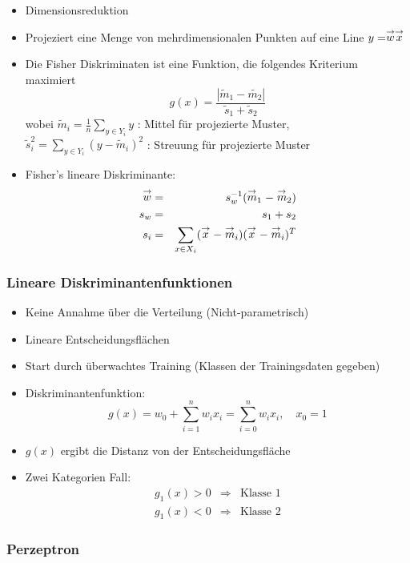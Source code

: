 \begin{itemize}
\item Dimensionsreduktion
\item Projeziert eine Menge von mehrdimensionalen Punkten auf eine Line $y = \stackrel{\to}{w} \stackrel{\to}{x}$
\item Die Fisher Diskriminaten ist eine Funktion, die folgendes Kriterium maximiert $$g(x) = \frac{| \tilde{m}_1 - \tilde{m_2}|}{\tilde{s}_1 + \tilde{s}_2}$$
wobei $\tilde{m}_i = \frac{1}{n} \sum\limits_{y \in Y_i} y$ : Mittel für projezierte Muster, $\tilde{s}_i^2 = \sum\limits_{y \in Y_i} (y - \tilde{m}_i)^2$ : Streuung für projezierte Muster
\item Fisher's lineare Diskriminante:
\begin{eqnarray*}
\stackrel{\to}{w} &=& s_w^{-1} (\stackrel{\to}{m}_1 - \stackrel{\to}{m}_2) \\ s_w &=& s_1 + s_2 \\ s_i &=& \sum\limits_{x \in X_i} (\stackrel{\to}{x} - \stackrel{\to}{m}_i)(\stackrel{\to}{x} - \stackrel{\to}{m}_i)^T
\end{eqnarray*}
\end{itemize}



\subsubsection*{Lineare Diskriminantenfunktionen}

\begin{itemize}
\item Keine Annahme über die Verteilung (Nicht-parametrisch)
\item Lineare Entscheidungsflächen
\item Start durch überwachtes Training (Klassen der Trainingsdaten gegeben)
\item Diskriminantenfunktion: $$g(x) = w_0 + \sum\limits_{i=1}^n w_ix_i = \sum\limits_{i=0}^n w_ix_i, \quad x_0 = 1$$
\item $g(x)$ ergibt die Distanz von der Entscheidungsfläche
\item Zwei Kategorien Fall:
\begin{eqnarray*}
g_1(x) > 0 &\Rightarrow& \textrm{Klasse 1} \\ g_1(x) < 0 &\Rightarrow& \textrm{Klasse 2}
\end{eqnarray*}
\end{itemize}

\subsubsection*{Perzeptron}

